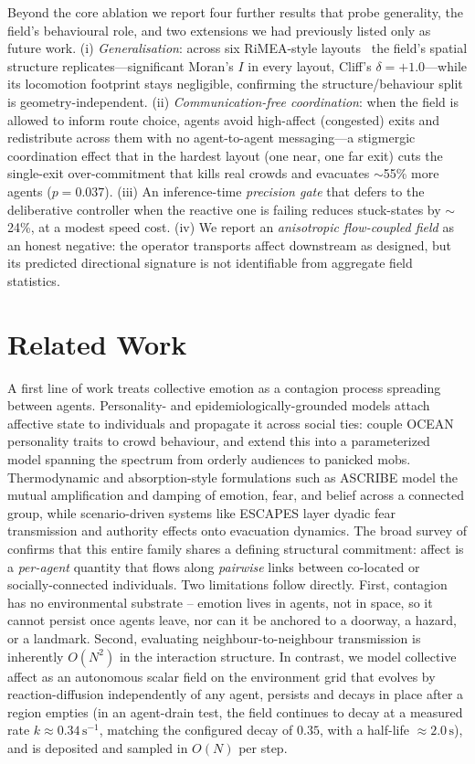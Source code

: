 \documentclass[sigconf,nonacm]{acmart}
\begin{document}
Beyond the core ablation we report four further results that probe generality, the field's behavioural role, and two extensions we had previously listed only as future work. (i) \emph{Generalisation}: across six RiMEA-style layouts~\cite{rimea} the field's spatial structure replicates---significant Moran's $I$ in every layout, Cliff's $\delta=+1.0$---while its locomotion footprint stays negligible, confirming the structure/behaviour split is geometry-independent. (ii) \emph{Communication-free coordination}: when the field is allowed to inform route choice, agents avoid high-affect (congested) exits and redistribute across them with no agent-to-agent messaging---a stigmergic~\cite{theraulaz1999stigmergy} coordination effect that in the hardest layout (one near, one far exit) cuts the single-exit over-commitment that kills real crowds and evacuates $\sim$55\% more agents ($p{=}0.037$). (iii) An inference-time \emph{precision gate} that defers to the deliberative controller when the reactive one is failing reduces stuck-states by $\sim$24\%, at a modest speed cost. (iv) We report an \emph{anisotropic flow-coupled field} as an honest negative: the operator transports affect downstream as designed, but its predicted directional signature is not identifiable from aggregate field statistics.

\section{Related Work}
A first line of work treats collective emotion as a contagion process spreading between agents. Personality- and epidemiologically-grounded models attach affective state to individuals and propagate it across social ties: \citet{durupinar2008} couple OCEAN personality traits to crowd behaviour, and \citet{durupinar2016} extend this into a parameterized model spanning the spectrum from orderly audiences to panicked mobs. Thermodynamic and absorption-style formulations such as ASCRIBE \citep{bosse2013ascribe} model the mutual amplification and damping of emotion, fear, and belief across a connected group, while scenario-driven systems like ESCAPES \citep{tsai2011escapes} layer dyadic fear transmission and authority effects onto evacuation dynamics. The broad survey of \citet{vanhaeringen2023} confirms that this entire family shares a defining structural commitment: affect is a \emph{per-agent} quantity that flows along \emph{pairwise} links between co-located or socially-connected individuals. Two limitations follow directly. First, contagion has no environmental substrate -- emotion lives in agents, not in space, so it cannot persist once agents leave, nor can it be anchored to a doorway, a hazard, or a landmark. Second, evaluating neighbour-to-neighbour transmission is inherently $O(N^2)$ in the interaction structure. In contrast, we model collective affect as an autonomous scalar field on the environment grid that evolves by reaction-diffusion independently of any agent, persists and decays in place after a region empties (in an agent-drain test, the field continues to decay at a measured rate $k \approx 0.34\,\text{s}^{-1}$, matching the configured decay of $0.35$, with a half-life $\approx 2.0\,\text{s}$), and is deposited and sampled in $O(N)$ per step.
\end{document}
